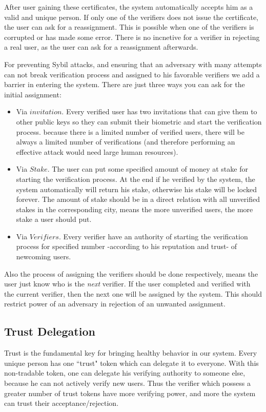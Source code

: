 \documentclass[conference]{IEEEtran}
\begin{document}
After user gaining these certificates, the system automatically accepts him as a valid and unique person. If only one of the verifiers does not issue the certificate, the user can ask for a reassignment. This is possible when one of the verifiers is corrupted or has made some error. There is no incnetive for a verifier in rejecting a real user, as the user can ask for a reassignment afterwards.


For preventing Sybil attacks, and  ensuring that an adversary with many attempts can not break verification process and assigned to his favorable verifiers we add a barrier in entering the system. There are just three ways you can ask for the initial assignment:
\begin{itemize}
\item Via $invitation$. Every verified user has two invitations that can give them to other public keys so they can submit their biometric and start the verification process. because there is a limited number of verified users, there will be always a limited number of verifications (and therefore performing an effective attack would need large human resources).

\item Via $Stake$. The user can put some specified amount of money at stake for starting the verification process. At the end if he verified by the system, the system automatically will return his stake, otherwise his stake will be locked forever. The amount of stake should be in a direct relation with all unverified stakes in the corresponding city, means the more unverified users, the more stake a user should put.

\item Via $Verifiers$. Every verifier have an authority of starting the verification process for specified number -according to his reputation and trust- of newcoming users.
\end{itemize}

Also the process of assigning the verifiers should be done respectively, means the user just know who is the \textit{next} verifier. If the user completed and verified with the current verifier, then the next one will be assigned by the system. This should restrict power of an adversary in rejection of an unwanted assignment.

\subsection{Trust Delegation}
Trust is the fundamental key for bringing healthy behavior in our system. Every unique person has one ``trust" token which can delegate it to everyone. With this non-tradable token, one can delegate his  verifying authority to someone else, because he can not actively verify new users. Thus the verifier which possess a greater number of trust tokens have more verifying power, and more the system can trust their acceptance/rejection.
\end{document}
